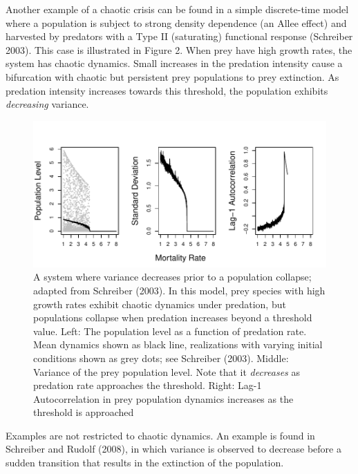 \documentclass[author-year, review]{elsarticle} %
\makeatletter
\def\maxwidth{\ifdim\Gin@nat@width>\linewidth\linewidth
\else\Gin@nat@width\fi}
\let\Oldincludegraphics\includegraphics
\renewcommand{\includegraphics}[1]{\Oldincludegraphics[width=\maxwidth]{#1}}
\makeatother
\begin{document}
Another example of a chaotic crisis can be found in a simple
discrete-time model where a population is subject to strong density
dependence (an Allee effect) and harvested by predators with a Type II
(saturating) functional response (Schreiber 2003). This case is
illustrated in Figure 2. When prey have high growth rates, the system
has chaotic dynamics. Small increases in the predation intensity cause a
bifurcation with chaotic but persistent prey populations to prey
extinction. As predation intensity increases towards this threshold, the
population exhibits \emph{decreasing} variance.

\begin{figure}[htbp]
\centering
\includegraphics{schreiber-fig.pdf}
\caption{A system where variance decreases prior to a population
collapse; adapted from Schreiber (2003). In this model, prey species
with high growth rates exhibit chaotic dynamics under predation, but
populations collapse when predation increases beyond a threshold value.
Left: The population level as a function of predation rate. Mean
dynamics shown as black line, realizations with varying initial
conditions shown as grey dots; see Schreiber (2003). Middle: Variance of
the prey population level. Note that it \emph{decreases} as predation
rate approaches the threshold. Right: Lag-1 Autocorrelation in prey
population dynamics increases as the threshold is approached}
\end{figure}

Examples are not restricted to chaotic dynamics. An example is found in
Schreiber and Rudolf (2008), in which variance is observed to decrease
before a sudden transition that results in the extinction of the
population.
\end{document}
